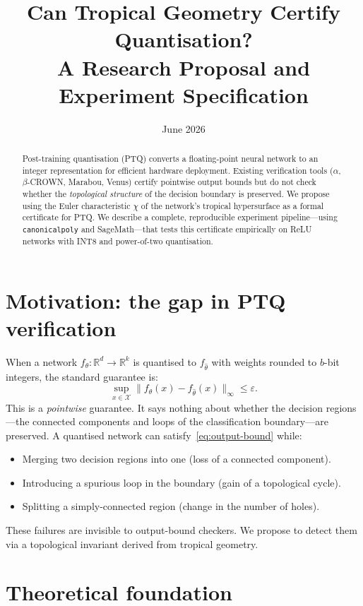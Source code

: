 \documentclass[11pt]{article}
\title{\textbf{Can Tropical Geometry Certify Quantisation?}\\
\large A Research Proposal and Experiment Specification}
\author{}
\date{June 2026}
\newcommand{\R}{\mathbb{R}}
\begin{document}
\maketitle

\begin{abstract}
Post-training quantisation (PTQ) converts a floating-point neural network to an
integer representation for efficient hardware deployment. Existing verification tools
($\alpha$,$\beta$-CROWN, Marabou, Venus) certify pointwise output bounds but do not
check whether the \emph{topological structure} of the decision boundary is preserved.
We propose using the Euler characteristic $\chi$ of the network's tropical hypersurface
as a formal certificate for PTQ. We describe a complete, reproducible experiment
pipeline---using \texttt{canonicalpoly} and SageMath---that tests this certificate
empirically on ReLU networks with INT8 and power-of-two quantisation.
\end{abstract}

\section{Motivation: the gap in PTQ verification}

When a network $f_\theta : \R^d \to \R^k$ is quantised to $f_{\hat\theta}$ with
weights rounded to $b$-bit integers, the standard guarantee is:
\begin{equation}
\sup_{x \in \mathcal{X}} \|f_\theta(x) - f_{\hat\theta}(x)\|_\infty \leq \varepsilon.
\label{eq:output-bound}
\end{equation}
This is a \emph{pointwise} guarantee. It says nothing about whether the decision
regions---the connected components and loops of the classification boundary---are
preserved. A quantised network can satisfy~\eqref{eq:output-bound} while:
\begin{itemize}[leftmargin=*]
\item Merging two decision regions into one (loss of a connected component).
\item Introducing a spurious loop in the boundary (gain of a topological cycle).
\item Splitting a simply-connected region (change in the number of holes).
\end{itemize}
These failures are invisible to output-bound checkers. We propose to detect them
via a topological invariant derived from tropical geometry.

\section{Theoretical foundation}
\end{document}
